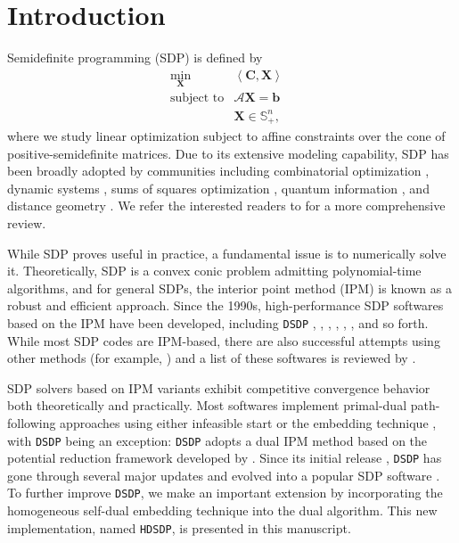 \section{Introduction}

Semidefinite programming (SDP) is defined
by
\begin{eqnarray}
  \min_{\mathbf{X}} & \left\langle \mathbf{C}, \mathbf{X} \right\rangle & \nonumber \\
  \text{subject to} & \mathcal{A} \mathbf{X} = \mathbf{b} & \\ 
  & \mathbf{X} \in \mathbb{S}_+^n, & \nonumber
\end{eqnarray}
where we study linear optimization subject to affine constraints over the cone of
positive-semidefinite matrices. Due to its extensive modeling capability, SDP has been broadly adopted by communities including combinatorial optimization {\cite{goemans1995improved, laurent2005semidefinite}},
dynamic systems {\cite{vandenberghe1996semidefinite}}, sums of squares
optimization {\cite{laurent2009sums}}, quantum
information {\cite{hayashi2016quantum}}, and distance geometry
{\cite{biswas2004semidefinite, so2007theory}}. We refer the interested
readers to {\cite{wolkowicz2005semidefinite}} for a more comprehensive review. 

While SDP proves useful in practice, a fundamental issue is to
numerically solve it. Theoretically, SDP is a convex conic problem  admitting polynomial-time algorithms, and for general SDPs, the interior point method (IPM) is known as a robust and efficient approach. Since the 1990s, high-performance SDP softwares based on the IPM have been developed, including {{\texttt{DSDP}}} {\cite{benson2008algorithm}}, 
{\cite{copt}},  {\cite{aps2019mosek}}, 
{\cite{polik2007sedumi}},  {\cite{toh2012implementation}},
 {\cite{borchers2006csdp}},  
{\cite{yamashita2012latest}} and so forth. While most SDP codes are IPM-based, there are also  successful attempts using other methods (for example, {\cite{kocvara2006pensdp, kwasniewiczimplementation, yang2015sdpnal}})
and a list of these softwares is reviewed by {\citet{majumdar2020recent}}.

SDP solvers based on IPM variants exhibit competitive convergence behavior both theoretically and practically. Most softwares implement primal-dual path-following approaches using either infeasible start
{\cite{potra1998superlinearly}} or the embedding technique
{\cite{potra1998homogeneous}}, with {{\texttt{DSDP}}} being an exception:
{{\texttt{DSDP}}} adopts a dual IPM method based on the potential reduction framework developed by {\citet{benson1999mixed}}.
Since its initial release {\cite{benson2000solving}}, {{\texttt{DSDP}}} has gone through several major updates and evolved into a popular SDP software {\cite{benson2008algorithm}}.
To further improve {{\texttt{DSDP}}}, we make an important extension by incorporating the homogeneous self-dual embedding technique into the dual algorithm. This new implementation, named {{\texttt{HDSDP}}}, is presented in this manuscript.

